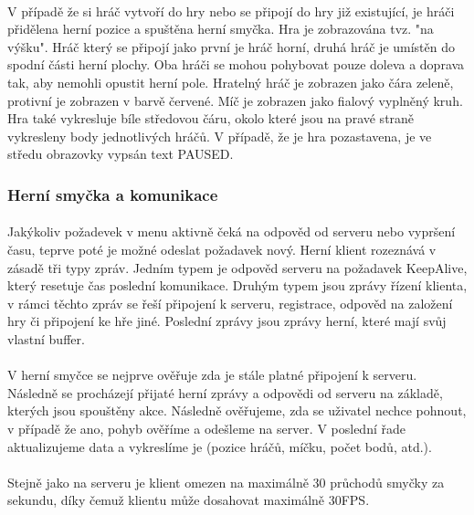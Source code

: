 \documentclass[12pt, a4paper]{article}
\begin{document}
\paragraph{}
V případě že si hráč vytvoří do hry nebo se připojí do hry již existující, je hráči přidělena herní pozice a spuštěna
herní smyčka. Hra je zobrazována tvz. "na výšku". Hráč který se připojí jako první je hráč horní, druhá hráč je
umístěn do spodní části herní plochy. Oba hráči se mohou pohybovat pouze doleva a doprava tak, aby nemohli opustit
herní pole. Hratelný hráč je zobrazen jako čára zeleně, protivní je zobrazen v barvě červené. Míč je zobrazen jako
fialový vyplněný kruh. Hra také vykresluje bíle středovou čáru, okolo které jsou na pravé straně vykresleny body
jednotlivých hráčů. V případě, že je hra pozastavena, je ve středu obrazovky vypsán text PAUSED.

\subsubsection{Herní smyčka a komunikace}
\paragraph{}
Jakýkoliv požadevek v menu aktivně čeká na odpověd od serveru nebo vypršení času, teprve poté je možné odeslat
požadavek nový. Herní klient rozeznává v zásadě tři typy zpráv. Jedním typem je odpověd serveru na požadavek
KeepAlive, který resetuje čas poslední komunikace. Druhým typem jsou zprávy řízení klienta, v rámci těchto zpráv se
řeší připojení k serveru, registrace, odpověd na založení hry či připojení ke hře jiné. Poslední zprávy jsou zprávy
herní, které mají svůj vlastní buffer.

\paragraph{}
V herní smyčce se nejprve ověřuje zda je stále platné připojení k serveru. Následně se procházejí přijaté herní
zprávy a odpovědi od serveru na základě, kterých jsou spouštěny akce. Následně ověřujeme, zda se uživatel nechce
pohnout, v případě že ano, pohyb ověříme a odešleme na server. V poslední řade aktualizujeme data a vykreslíme je
(pozice hráčů, míčku, počet bodů, atd.).

\paragraph{}
Stejně jako na serveru je klient omezen na maximálně 30 průchodů smyčky za sekundu, díky čemuž klientu může dosahovat
maximálně 30FPS.
\end{document}
